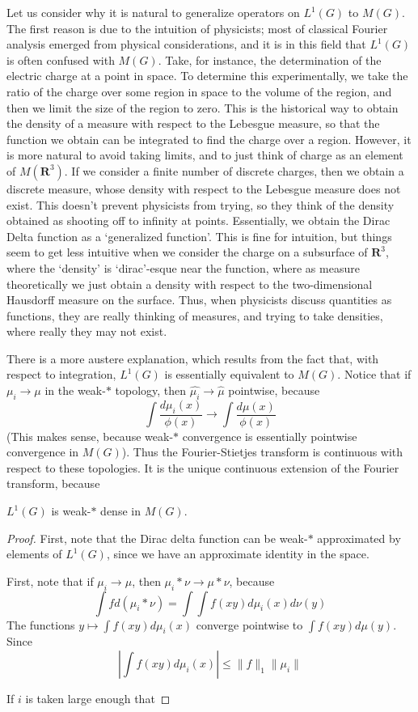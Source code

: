 Let us consider why it is natural to generalize operators on $L^1(G)$ to $M(G)$. The first reason is due to the intuition of physicists; most of classical Fourier analysis emerged from physical considerations, and it is in this field that $L^1(G)$ is often confused with $M(G)$. Take, for instance, the determination of the electric charge at a point in space. To determine this experimentally, we take the ratio of the charge over some region in space to the volume of the region, and then we limit the size of the region to zero. This is the historical way to obtain the density of a measure with respect to the Lebesgue measure, so that the function we obtain can be integrated to find the charge over a region. However, it is more natural to avoid taking limits, and to just think of charge as an element of $M(\mathbf{R}^3)$. If we consider a finite number of discrete charges, then we obtain a discrete measure, whose density with respect to the Lebesgue measure does not exist. This doesn't prevent physicists from trying, so they think of the density obtained as shooting off to infinity at points. Essentially, we obtain the Dirac Delta function as a `generalized function'. This is fine for intuition, but things seem to get less intuitive when we consider the charge on a subsurface of $\mathbf{R}^3$, where the `density' is `dirac'-esque near the function, where as measure theoretically we just obtain a density with respect to the two-dimensional Hausdorff measure on the surface. Thus, when physicists discuss quantities as functions, they are really thinking of measures, and trying to take densities, where really they may not exist.

There is a more austere explanation, which results from the fact that, with respect to integration, $L^1(G)$ is essentially equivalent to $M(G)$. Notice that if $\mu_i \to \mu$ in the weak-$*$ topology, then $\widehat{\mu_i} \to \widehat{\mu}$ pointwise, because
%
\[ \int \frac{d\mu_i(x)}{\phi(x)} \to \int \frac{d\mu(x)}{\phi(x)} \]
%
(This makes sense, because weak-$*$ convergence is essentially pointwise convergence in $M(G)$). Thus the Fourier-Stietjes transform is continuous with respect to these topologies. It is the unique continuous extension of the Fourier transform, because

\begin{theorem}
    $L^1(G)$ is weak-$*$ dense in $M(G)$.
\end{theorem}
\begin{proof}
    First, note that the Dirac delta function can be weak-$*$ approximated by elements of $L^1(G)$, since we have an approximate identity in the space.

    First, note that if $\mu_i \to \mu$, then $\mu_i * \nu \to \mu * \nu$, because
    \[ \int f d(\mu_i * \nu) = \int \int f(xy) d\mu_i(x) d\nu(y) \]
    The functions $y \mapsto \int f(xy) d\mu_i(x)$ converge pointwise to $\int f(xy) d\mu(y)$. Since
    \[ \left| \int f(xy) d\mu_i(x) \right| \leq \| f \|_1 \| \mu_i \| \]

    If $i$ is taken large enough that 
\end{proof}

